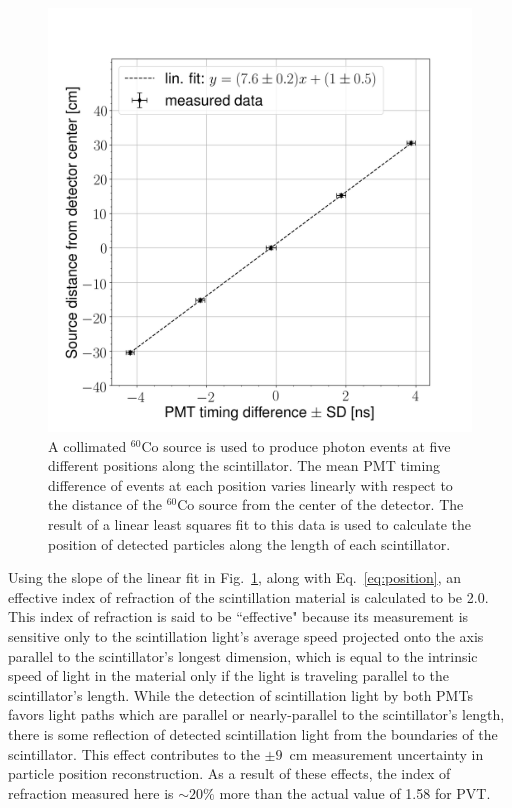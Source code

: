 \documentclass[%
 reprint,
 calc,
 amsmath,amssymb,
 aps,
 nofootinbib,
 linenumbers
]{revtex4-1}
\begin{document}
\begin{figure}[]
    \centering    
    \includegraphics[width = \figsize\textwidth]{PMTDifference.png}
    \caption{
    A collimated $^{60}$Co source is used to produce photon events at five different positions along the scintillator.
    The mean PMT timing difference of events at each position varies linearly with respect to the distance of the $^{60}$Co source from the center of the detector. 
    The result of a linear least squares fit to this data is used to calculate the position of detected particles along the length of each scintillator.
    }
    \label{fig:PMTDifference}
\end{figure}

Using the slope of the linear fit in Fig.~\ref{fig:PMTDifference}, along with Eq.~\ref{eq:position}, an effective index of refraction of the scintillation material is calculated to be 2.0.
This index of refraction is said to be ``effective" because its measurement is sensitive only to the scintillation light's average speed projected onto the axis parallel to the scintillator's longest dimension, which is equal to the intrinsic speed of light in the material only if the light is traveling parallel to the scintillator's length.
While the detection of scintillation light by both PMTs favors light paths which are parallel or nearly-parallel to the scintillator's length, there is some reflection of detected scintillation light from the boundaries of the scintillator.
This effect contributes to the $\pm9$~cm measurement uncertainty in particle position reconstruction.
As a result of these effects, the index of refraction measured here is $\sim{20}\%$ more than the actual value of 1.58 for PVT. 
\end{document}
